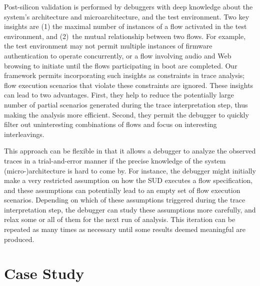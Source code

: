 \documentclass[conference]{IEEEtran}
\begin{document}
Post-silicon validation is performed by debuggers with deep
knowledge about the system's architecture and
microarchitecture, and the test environment.  Two key
insights are (1) the maximal number of instances of a flow
activated in the test environment, and (2)~the mutual
relationship between two flows.  For example, the test
environment may not permit multiple instances of firmware
authentication to operate concurrently, or a flow involving
audio and Web browsing to initiate until the flows
participating in boot are completed.  Our framework permits
incorporating such insights as constraints in trace
analysis; flow execution scenarios that violate these
constraints are ignored.  These insights can lead to two
advantages.  First, they help to reduce the potentially
large number of partial scenarios generated during the trace
interpretation step, thus making the analysis more
efficient.  Second, they permit the debugger to quickly
filter out uninteresting combinations of flows and focus on
interesting interleavings.

This approach can be flexible in that it allows a debugger
to analyze the observed traces in a trial-and-error manner
if the precise knowledge of the system (micro-)architecture
is hard to come by.  For instance, the debugger might
initially make a very restricted assumption on how the SUD
executes a flow specification, and these assumptions can
potentially lead to an empty set of flow execution
scenarios.  Depending on which of these assumptions
triggered during the trace interpretation step, the debugger
can study these assumptions more carefully, and relax some
or all of them for the next run of analysis.  This iteration
can be repeated as many times as necessary until some
results deemed meaningful are produced.



  
%



%
%
\section{Case Study}
\end{document}
